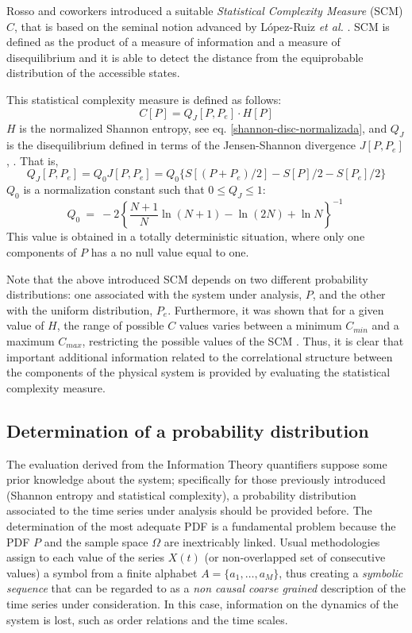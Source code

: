 Rosso and coworkers \cite{Lamberti2004} introduced a suitable \textit{Statistical Complexity Measure} (SCM) $C$, that is  based on the seminal notion advanced by L\'opez-Ruiz {\it et al.} \cite{Lopez-Ruiz1995}.
SCM is defined as the product of a measure of information and a measure of disequilibrium  and it is able to detect the distance from the equiprobable distribution of the accessible states.

This statistical complexity measure \cite{Martin2003,Lamberti2004} is defined as follows: 
\begin{equation}
C[P] = Q_{J}[P,P_e] \cdot H[P]
\label{complexity}
\end{equation}
$H$ is the normalized Shannon entropy, see eq. \ref{shannon-disc-normalizada}, and $Q_{J}$ is the disequilibrium  defined in terms of the Jensen-Shannon divergence $J[P, P_e]$, \cite{Grosse2002}.
That is,
\begin{equation}
\label{disequilibrium}	
Q_{J} [ P, P_e] = Q_{0} J[ P, P_e] = Q_{0} \{ S[(P + P_e)/2 ] - S[ P ]/2 - S[P_e]/2\}
\end{equation}
$Q_0$ is a normalization constant such that $0 \leq Q_{J} \leq 1$:
\begin{equation}
Q_0 ~=~ -2 \left\{ {\frac{N+1}{N}} \ln (N+1) - \ln (2N) + \ln N \right\}^{-1} \
\label{q0-jensen-1}
\end{equation}
This value is obtained in a totally deterministic situation, where only one components of $P$ has a no null value equal to one.

Note that the above introduced SCM depends on two different probability distributions: one associated with the system under analysis, $P$, and the other with the uniform distribution, $P_e$.
Furthermore, it was shown that for a given value of $H$, the range of possible $C$ values varies between a minimum $C_{min}$ and a maximum $C_{max}$, restricting the possible values of the SCM \cite{Martin2006}.
Thus, it is clear that important additional information related to the correlational structure between the components of the physical system is provided by evaluating the statistical complexity measure. 

\subsection{Determination of a probability distribution}

The evaluation derived from the  Information Theory quantifiers suppose some prior knowledge about the system; specifically for those previously introduced (Shannon entropy and statistical complexity), a probability distribution associated to the time series under analysis should be provided before.
The determination of the most adequate PDF is a fundamental problem because the PDF $P$ and the sample space $\Omega$ are inextricably linked.
Usual methodologies assign to each value of the series $X(t)$ (or non-overlapped set of consecutive values) a symbol from a finite alphabet $A=\{a_1,\dots,a_M\}$, thus creating a {\it symbolic sequence} that can be regarded to as a {\it non causal coarse grained\/} description of the time series under consideration. 
In this case, information on the dynamics of the system is lost, such as order relations and the time scales.

